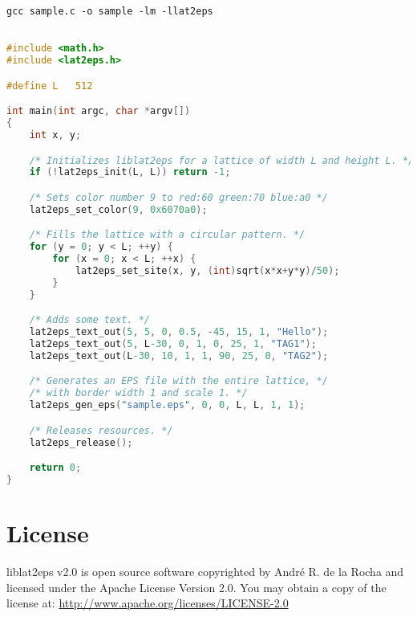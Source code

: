 \documentclass[a4paper]{article}
\begin{document}
\texttt{gcc sample.c -o sample -lm -llat2eps}
\bigbreak\bigbreak

\begin{lstlisting}[language=C, frame=single]

#include <math.h>
#include <lat2eps.h>

#define L   512

int main(int argc, char *argv[])
{
	int x, y;

	/* Initializes liblat2eps for a lattice of width L and height L. */
	if (!lat2eps_init(L, L)) return -1;

	/* Sets color number 9 to red:60 green:70 blue:a0 */
	lat2eps_set_color(9, 0x6070a0);

	/* Fills the lattice with a circular pattern. */
	for (y = 0; y < L; ++y) {
		for (x = 0; x < L; ++x) {
			lat2eps_set_site(x, y, (int)sqrt(x*x+y*y)/50);
		}
	}

	/* Adds some text. */
	lat2eps_text_out(5, 5, 0, 0.5, -45, 15, 1, "Hello");
	lat2eps_text_out(5, L-30, 0, 1, 0, 25, 1, "TAG1");
	lat2eps_text_out(L-30, 10, 1, 1, 90, 25, 0, "TAG2");

	/* Generates an EPS file with the entire lattice, */
	/* with border width 1 and scale 1. */
	lat2eps_gen_eps("sample.eps", 0, 0, L, L, 1, 1); 

	/* Releases resources. */
	lat2eps_release();

	return 0;	
}

\end{lstlisting}
\bigbreak\bigbreak


\section{License}

liblat2eps v2.0 is open source software copyrighted by André R. de la Rocha and licensed under the Apache License Version 2.0. You may obtain a copy of the license at: \url{http://www.apache.org/licenses/LICENSE-2.0}
\end{document}
